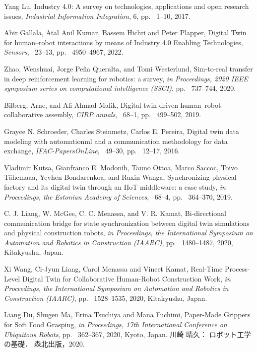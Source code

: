 
\begin{thebibliography}{99}			%


		Yang Lu,
		Industry 4.0: A survey on technologies, applications and open research issues,
		{\it  Industrial Information Integration}, 6, pp. ~1--10, 2017.

		Abir Gallala, Atal Anil Kumar, Bassem Hichri and Peter Plapper,
		Digital Twin for human–robot interactions by means of Industry 4.0 Enabling Technologies,
		{\it  Sensors}, ~23--13, pp. ~4950--4967, 2022.

		Zhao, Wenshuai, Jorge Peña Queralta, and Tomi Westerlund,
		Sim-to-real transfer in deep reinforcement learning for robotics: a survey,
		{\it  in Proceedings, 2020 IEEE symposium series on computational intelligence (SSCI)}, pp. ~737--744, 2020.

		Bilberg, Arne, and Ali Ahmad Malik,
		Digital twin driven human–robot collaborative assembly,
		{\it  CIRP annals}, ~68--1, pp. ~499--502, 2019.

		Grayce N. Schroeder, Charles Steinmetz, Carlos E. Pereira,
		Digital twin data modeling with automationml and a communication methodology for data exchange,
		{\it  IFAC-PapersOnLine}, ~49--30, pp. ~12--17, 2016.

		Vladimir Kutsa, Gianfranco E. Modonib, Tauno Ottoa, Marco Saccoc, Toivo Tähemaaa, Yevhen Bondarenkoa, and Ruxin Wanga,
		Synchronizing physical factory and its digital twin through an IIoT middleware: a case study,
		{\it  in Proceedings, the Estonian Academy of Sciences}, ~68--4, pp. ~364--370, 2019.

		C. J. Liang, W. McGee, C. C. Menassa, and V. R. Kamat,
		Bi-directional communication bridge for state synchronization between digital twin simulations and physical construction robots,
		{\it   in Proceedings, the International Symposium on Automation and Robotics in Construction (IAARC)}, pp. ~1480--1487, 2020, Kitakyushu, Japan.

		Xi Wang, Ci-Jyun Liang, Carol Menassa and Vineet Kamat,
		Real-Time Process-Level Digital Twin for Collaborative Human-Robot Construction Work,
		{\it  in Proceedings, the International Symposium on Automation and Robotics in Construction (IAARC)},  pp. ~1528--1535, 2020, Kitakyushu, Japan.

		Liang Du, Shugen Ma, Erina Tsuchiya and Mana Fuchimi,
		Paper-Made Grippers for Soft Food Grasping,
		{\it  in Proceedings, 17th International Conference on Ubiquitous Robots},  pp. ~362--367, 2020, Kyoto, Japan.
	 川崎 晴久：
		ロボット工学の基礎．
			森北出版，2020.

\end{thebibliography}
